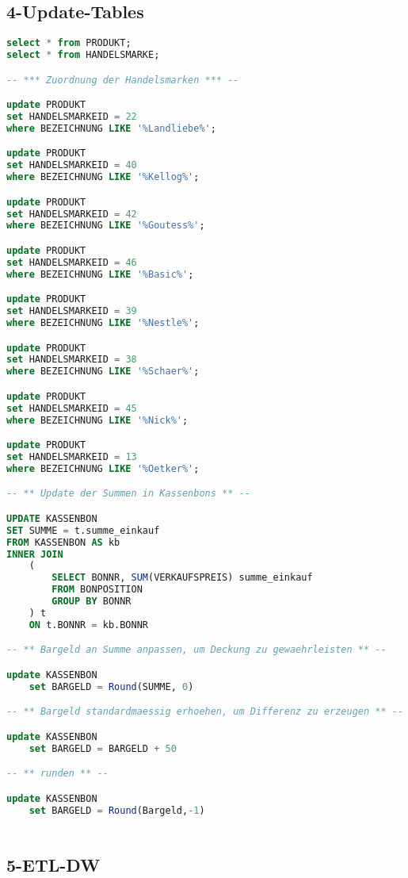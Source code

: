 \subsection{4-Update-Tables}

\begin{lstlisting}[language=SQL]
  select * from PRODUKT;
select * from HANDELSMARKE;

-- *** Zuordnung der Handelsmarken *** --

update PRODUKT
set HANDELSMARKEID = 22
where BEZEICHNUNG LIKE '%Landliebe%';

update PRODUKT
set HANDELSMARKEID = 40
where BEZEICHNUNG LIKE '%Kellog%';

update PRODUKT
set HANDELSMARKEID = 42
where BEZEICHNUNG LIKE '%Goutess%';

update PRODUKT
set HANDELSMARKEID = 46
where BEZEICHNUNG LIKE '%Basic%';

update PRODUKT
set HANDELSMARKEID = 39
where BEZEICHNUNG LIKE '%Nestle%';

update PRODUKT
set HANDELSMARKEID = 38
where BEZEICHNUNG LIKE '%Schaer%';

update PRODUKT
set HANDELSMARKEID = 45
where BEZEICHNUNG LIKE '%Nick%';

update PRODUKT
set HANDELSMARKEID = 13
where BEZEICHNUNG LIKE '%Oetker%';

-- ** Update der Summen in Kassenbons ** --

UPDATE KASSENBON
SET SUMME = t.summe_einkauf
FROM KASSENBON AS kb
INNER JOIN
    (
        SELECT BONNR, SUM(VERKAUFSPREIS) summe_einkauf
        FROM BONPOSITION
        GROUP BY BONNR
    ) t
    ON t.BONNR = kb.BONNR

-- ** Bargeld an Summe anpassen, um Deckung zu gewaehrleisten ** --

update KASSENBON
	set BARGELD = Round(SUMME, 0)

-- ** Bargeld standardmaessig erhoehen, um Differenz zu erzeugen ** --

update KASSENBON
	set BARGELD = BARGELD + 50

-- ** runden ** --

update KASSENBON
	set BARGELD = Round(Bargeld,-1)



\end{lstlisting}

\subsection{5-ETL-DW}

